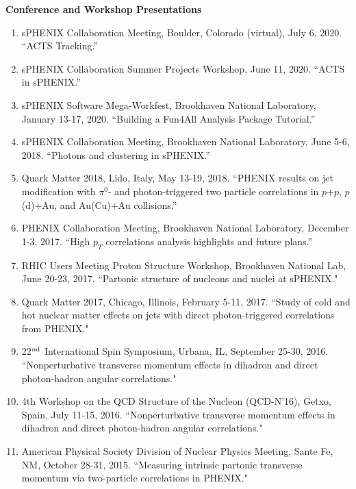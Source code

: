 \documentclass[11pt]{article}
\begin{document}
\begin{flushleft}
	\Large\textbf{Conference and Workshop Presentations} \\
	\normalsize
	\begin{enumerate}
		\item sPHENIX Collaboration Meeting, Boulder, Colorado (virtual), July 6, 2020. ``ACTS Tracking.''
		\item sPHENIX Collaboration Summer Projects Workshop, June 11, 2020. ``ACTS in sPHENIX.''
		\item sPHENIX Software Mega-Workfest, Brookhaven National Laboratory, January 13-17, 2020. ``Building a Fun4All Analysis Package Tutorial.''
		\item sPHENIX Collaboration Meeting, Brookhaven National Laboratory, June 5-6, 2018. ``Photons and clustering in sPHENIX.''
		\item Quark Matter 2018, Lido, Italy, May 13-19, 2018. ``PHENIX results on jet modification with $\pi^0$- and photon-triggered two particle correlations in $p$$+$$p$, $p$(d)+Au, and Au(Cu)+Au collisions.''
		
		\item PHENIX Collaboration Meeting, Brookhaven National Laboratory, December 1-3, 2017. ``High $p_T$ correlations analysis highlights and future plans.''
		
		\item RHIC Users Meeting Proton Structure Workshop, Brookhaven National Lab, June 20-23, 2017. ``Partonic structure of nucleons and nuclei at sPHENIX."
		
		\item Quark Matter 2017, Chicago, Illinois, February 5-11, 2017. ``Study of cold and hot nuclear matter effects on jets with direct photon-triggered correlations from PHENIX."
		
		
		\item 22$^{\rm nd}$ International Spin Symposium, Urbana, IL, September 25-30, 2016. ``Nonperturbative transverse momentum effects in dihadron and direct photon-hadron angular correlations."
		
		\item 4th Workshop on the QCD Structure of the Nucleon (QCD-N'16), Getxo, Spain, July 11-15, 2016. ``Nonperturbative transverse momentum effects in dihadron and direct photon-hadron angular correlations."
		
		\item American Physical Society Division of Nuclear Physics Meeting, Sante Fe, NM, October 28-31, 2015. ``Measuring intrinsic partonic transverse momentum via two-particle correlations in PHENIX."
		

\end{enumerate}
\end{flushleft}
\end{document}
